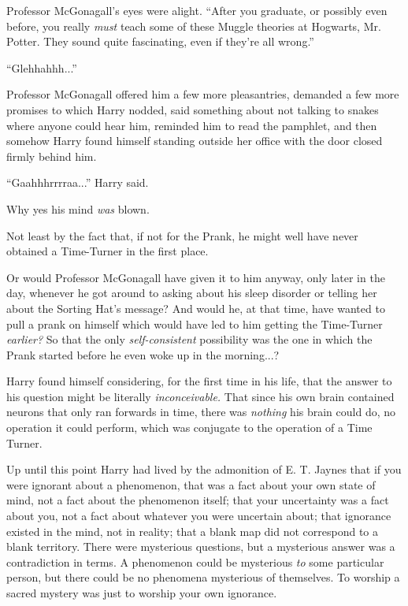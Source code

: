Professor McGonagall's eyes were alight. ``After you graduate, or possibly even before, you really \emph{must} teach some of these Muggle theories at Hogwarts, Mr. Potter. They sound quite fascinating, even if they're all wrong.''

``Glehhahhh...''

Professor McGonagall offered him a few more pleasantries, demanded a few more promises to which Harry nodded, said something about not talking to snakes where anyone could hear him, reminded him to read the pamphlet, and then somehow Harry found himself standing outside her office with the door closed firmly behind him.

``Gaahhhrrrraa...'' Harry said.

Why yes his mind \emph{was} blown.

Not least by the fact that, if not for the Prank, he might well have never obtained a Time-Turner in the first place.

Or would Professor McGonagall have given it to him anyway, only later in the day, whenever he got around to asking about his sleep disorder or telling her about the Sorting Hat's message? And would he, at that time, have wanted to pull a prank on himself which would have led to him getting the Time-Turner \emph{earlier?} So that the only \emph{self-consistent} possibility was the one in which the Prank started before he even woke up in the morning...?

Harry found himself considering, for the first time in his life, that the answer to his question might be literally \emph{inconceivable.} That since his own brain contained neurons that only ran forwards in time, there was \emph{nothing} his brain could do, no operation it could perform, which was conjugate to the operation of a Time Turner.

Up until this point Harry had lived by the admonition of E. T. Jaynes that if you were ignorant about a phenomenon, that was a fact about your own state of mind, not a fact about the phenomenon itself; that your uncertainty was a fact about you, not a fact about whatever you were uncertain about; that ignorance existed in the mind, not in reality; that a blank map did not correspond to a blank territory. There were mysterious questions, but a mysterious answer was a contradiction in terms. A phenomenon could be mysterious \emph{to} some particular person, but there could be no phenomena mysterious of themselves. To worship a sacred mystery was just to worship your own ignorance.

